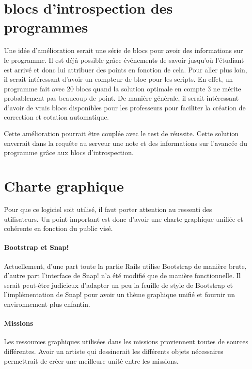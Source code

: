 \section{blocs d'introspection des programmes}
Une idée d'amélioration serait une série de blocs pour avoir des informations sur le programme. Il est déjà possible grâce événements de savoir jusqu'où l'étudiant est arrivé et donc lui attribuer des points en fonction de cela. Pour aller plus loin, il serait intéressant d'avoir un compteur de bloc pour les scripts. En effet, un programme fait avec 20 blocs quand la solution optimale en compte 3 ne mérite probablement pas beaucoup de point.
De manière générale, il serait intéressant d'avoir de vrais blocs disponibles pour les professeurs pour faciliter la création de correction et cotation automatique.

Cette amélioration pourrait être couplée avec le test de réussite. Cette solution enverrait dans la requête au serveur une note et des informations sur l'avancée du programme grâce aux blocs d'introspection.

\section{Charte graphique}
Pour que ce logiciel soit utilisé, il faut porter attention au ressenti des utilisateurs. Un point important est donc d'avoir une charte graphique unifiée et cohérente en fonction du public visé.

\paragraph{Bootstrap et Snap!}
Actuellement, d'une part toute la partie Rails utilise Bootstrap de manière brute, d'autre part l'interface de Snap! n'a été modifié que de manière fonctionnelle. Il serait peut-être judicieux d'adapter un peu la feuille de style de Bootstrap et l'implémentation de Snap! pour avoir un thème graphique unifié et fournir un environnement plus enfantin.

\paragraph{Missions}
Les ressources graphiques utilisées dans les missions proviennent toutes de sources différentes. Avoir un artiste qui dessinerait les différents objets nécessaires permettrait de créer une meilleure unité entre les missions.


% 
% 
% 
% 
% 
% 
